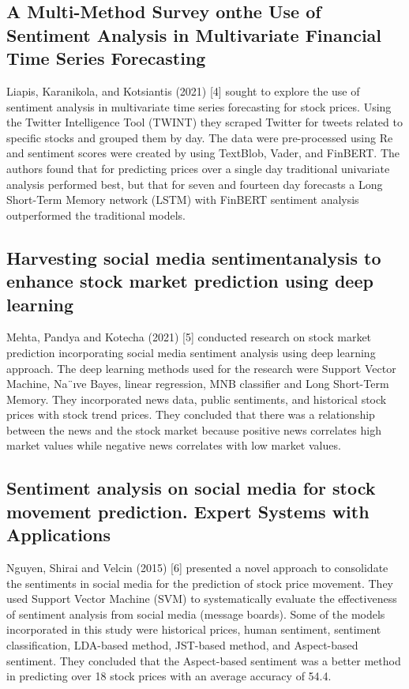 \documentclass{llncs}
\begin{document}
\subsection{A Multi-Method Survey onthe Use of Sentiment Analysis in Multivariate Financial Time Series Forecasting}

Liapis, Karanikola, and Kotsiantis (2021) [4] sought to explore the use of sentiment analysis in multivariate time series forecasting for stock prices. Using the Twitter Intelligence Tool (TWINT) they scraped Twitter for tweets related to specific stocks and grouped them by day. The data were pre-processed using Re and sentiment scores were created by using TextBlob, Vader, and FinBERT. The authors found that for predicting prices over a single day traditional univariate analysis performed best, but that for seven and fourteen day forecasts a Long Short-Term Memory network (LSTM) with FinBERT sentiment analysis outperformed the traditional models.

\subsection{Harvesting  social  media  sentimentanalysis to enhance stock market prediction using deep learning}

Mehta, Pandya and Kotecha (2021) [5] conducted research on stock market prediction incorporating social media sentiment analysis using deep learning approach. The deep learning methods used for the research were Support Vector Machine, Na¨ıve Bayes, linear regression, MNB classifier and Long Short-Term Memory. They incorporated news data, public sentiments, and historical stock prices with stock trend prices. They concluded that there was a relationship between the news and the stock market because positive news correlates high market values while negative news correlates with low market values.

\subsection{Sentiment analysis on social media for stock movement prediction. Expert Systems with Applications}

Nguyen, Shirai and Velcin (2015) [6] presented a novel approach to consolidate the sentiments in social media for the prediction of stock price movement. They used Support Vector Machine (SVM) to systematically evaluate the effectiveness of sentiment analysis from social media (message boards). Some of the models incorporated in this study were historical prices, human sentiment, sentiment classification, LDA-based method, JST-based method, and Aspect-based sentiment. They concluded that the Aspect-based sentiment was a better method in predicting over 18 stock prices with an average accuracy of 54.4.
\end{document}
